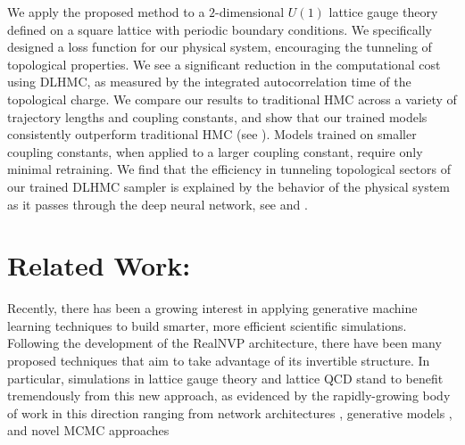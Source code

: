\documentclass{article} %
\begin{document}
We apply the proposed method to a \(2\)-dimensional \(U(1)\) lattice gauge theory defined on a square lattice with
periodic boundary conditions.
%
We specifically designed a loss function for our physical system, encouraging the tunneling of topological properties.
%
We see a significant reduction in the computational cost using DLHMC, as measured by the integrated autocorrelation time
of the topological charge.
%
We compare our results to traditional HMC across a variety of trajectory lengths and coupling constants, and show that
our trained models consistently outperform traditional HMC (see ).
%
Models trained on smaller coupling constants, when applied to a larger coupling constant, require only minimal
retraining.
%
We find that the efficiency in tunneling topological sectors of our trained DLHMC sampler
is explained by the behavior of the physical system as it passes through the deep neural network,
see  and .
%
\section{\label{sec:relatedwork}Related Work:}
Recently, there has been a growing interest in applying generative machine learning techniques to build smarter, more
efficient scientific simulations.
%
Following the development of the RealNVP \citep{dinhRealNVP} architecture, there have been many proposed techniques that
aim to take advantage of its invertible structure.
%
In particular, simulations in lattice gauge theory and lattice QCD stand to benefit tremendously from this new approach,
as evidenced by the rapidly-growing body of work in this direction ranging from network architectures
\citep{dinhRealNVP,favoni2020lattice,toth2020hamiltonian}, %
generative models
\citep{albergo2019flow,albergo2021introduction,medvidovic2020generative,boyda2020sampling,kanwar2020equivariant,wehenkel2020you,tomiya2021gauge},
and novel MCMC approaches
\citep{pasarica2010adaptively,tanaka2017towards,hoffman2019neutra,neklyudov2020orbital,neklyudov2020involutive,rezende2020normalizing,li2020neural}
\end{document}
